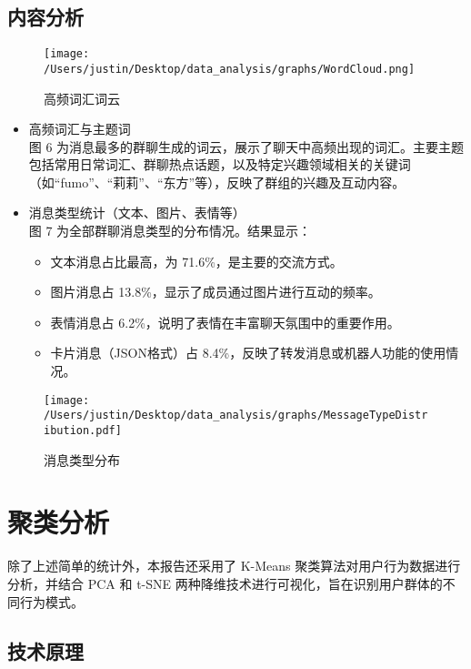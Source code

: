 \documentclass{paper}
\begin{document}
\subsection{内容分析}
\begin{figure}[H]
    \centering
    \texttt{[image: /Users/justin/Desktop/data\_analysis/graphs/WordCloud.png]}
    \caption{高频词汇词云}
    \label{fig:wordcloud}
\end{figure}
\begin{itemize}
\item 高频词汇与主题词\\
图 6 为消息最多的群聊生成的词云，展示了聊天中高频出现的词汇。主要主题包括常用日常词汇、群聊热点话题，以及特定兴趣领域相关的关键词（如“fumo”、“莉莉”、“东方”等），反映了群组的兴趣及互动内容。

\item 消息类型统计（文本、图片、表情等）\\ 
图 7 为全部群聊消息类型的分布情况。结果显示：
\begin{itemize}
    \item 文本消息占比最高，为 71.6\%，是主要的交流方式。
    \item 图片消息占 13.8\%，显示了成员通过图片进行互动的频率。
    \item 表情消息占 6.2\%，说明了表情在丰富聊天氛围中的重要作用。
    \item 卡片消息（JSON格式）占 8.4\%，反映了转发消息或机器人功能的使用情况。
\end{itemize}

\end{itemize}

\begin{figure}[H]
    \centering
    \texttt{[image: /Users/justin/Desktop/data\_analysis/graphs/MessageTypeDistribution.pdf]}
    \caption{消息类型分布}
    \label{fig:msg_type_dist}
\end{figure}

\section{聚类分析}

除了上述简单的统计外，本报告还采用了 K-Means 聚类算法对用户行为数据进行分析，并结合 PCA 和 t-SNE 两种降维技术进行可视化，旨在识别用户群体的不同行为模式。

\subsection{技术原理}
\end{document}
